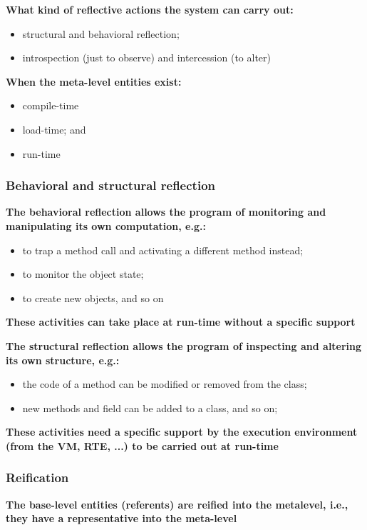 \textbf{What kind of reflective actions the system can carry out:}
\begin{itemize}
	\item structural and behavioral reflection;
	\item introspection (just to observe) and intercession (to alter)
\end{itemize}

\textbf{When the meta-level entities exist:}
\begin{itemize}
	\item compile-time
	\item load-time; and
	\item run-time
\end{itemize}

\subsubsection{Behavioral and structural reflection}

\textbf{The behavioral reflection allows the program of monitoring and manipulating its own computation, e.g.:}
\begin{itemize}
	\item to trap a method call and activating a different method instead;
	\item to monitor the object state;
	\item to create new objects, and so on
\end{itemize}

\textbf{These activities can take place at run-time without a specific support}

\textbf{The structural reflection allows the program of inspecting and altering its own structure, e.g.:}
\begin{itemize}
	\item the code of a method can be modified or removed from the class;
	\item new methods and field can be added to a class, and so on;
\end{itemize}

\textbf{These activities need a specific support by the execution environment (from the VM, RTE, ...) to be carried out at run-time}

\subsubsection{Reification}
\textbf{The base-level entities (referents) are reified into the metalevel, i.e., they have a representative into the meta-level}

